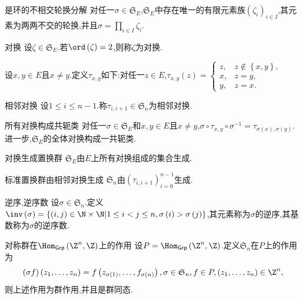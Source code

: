 \begin{proposition}{是环的不相交轮换分解}{}
	对任一$\sigma\in\mathfrak{S}_{E}$,$\mathfrak{S}_{E}$中存在唯一的有限元素族$\left(\zeta_{i}\right)_{i\in I}$,其元素为两两不交的轮换,并且$\sigma=\prod\limits_{i\in I}\zeta_{i}$.
\end{proposition}

\begin{definition}{对换}{}
	设$\zeta\in\mathfrak{S}_{E}$.若$\ord\left(\zeta\right)=2$,则称$\zeta$为对换.
\end{definition}

\begin{definition}{}{}
	设$x,y\in E$且$x\neq y$.定义$\tau_{x,y}$如下:对任一$z\in E$,$\tau_{x,y}\left(z\right)=
	\begin{cases}
		z,&z\notin\left\{x,y\right\},\\
		x,&z=y,\\
		y,&z=x.
	\end{cases}$
\end{definition}

\begin{definition}{相邻对换}{}
	设$1\leq i\leq n-1$.称$\tau_{i,i+1}\in\mathfrak{S}_{n}$为相邻对换.
\end{definition}

\begin{theorem}{所有对换构成共轭类}{}
	对任一$\sigma\in\mathfrak{S}_{E}$和$x,y\in E$且$x\neq y$,$\sigma\circ\tau_{x,y}\circ\sigma^{-1}=\tau_{\sigma\left(x\right),\sigma\left(y\right)}$.进一步,$\mathfrak{S}_{E}$的全体对换构成一共轭类.
\end{theorem}

\begin{proposition}{对换生成置换群}{}
	$\mathfrak{S}_{E}$由$E$上所有对换组成的集合生成.
\end{proposition}

\begin{proposition}{标准置换群由相邻对换生成}{}
	$\mathfrak{S}_{n}$由$\left(\tau_{i,i+1}\right)_{i=0}^{n-1}$生成.
\end{proposition}

\begin{definition}{逆序,逆序数}{}
	设$\sigma\in\mathfrak{S}_{n}$.定义$\inv\left(\sigma\right)=\left\{\left(i,j\right)\in\N\times\N\middle|1\leq i<j\leq n,\sigma\left(i\right)>\sigma\left(j\right)\right\}$,其元素称为$\sigma$的逆序,其基数称为$\sigma$的逆序数.
\end{definition}

\begin{proposition}{对称群在$\Hom_{\mathsf{Grp}}\left(\Z^{n},\Z\right)$上的作用}{}
	设$P=\Hom_{\mathsf{Grp}}\left(\Z^{n},\Z\right)$.定义$\mathfrak{S}_{n}$在$P$上的作用为
	\begin{align*}
		\left(\sigma f\right)\left(z_{1},\ldots,z_{n}\right)=f\left(z_{\sigma\left(1\right)},\ldots,f_{\sigma\left(n\right)}\right),\sigma\in\mathfrak{S}_{n},f\in P,\left(z_{1},\ldots,z_{n}\right)\in\Z^{n},
	\end{align*}
	则上述作用为群作用,并且是群同态.
\end{proposition}

